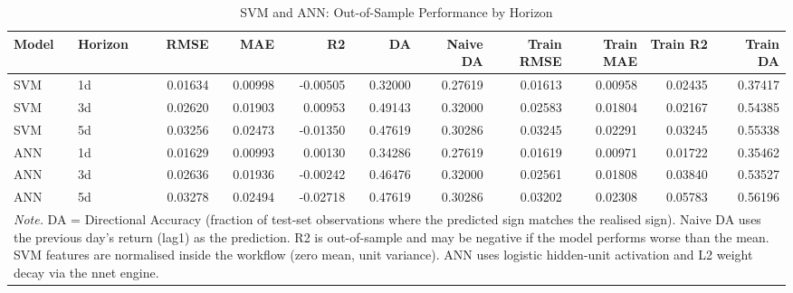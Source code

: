 \begin{table}[!ht]
\centering
\caption{\label{tab:svm_ann_metrics}SVM and ANN: Out-of-Sample Performance by Horizon}
\footnotesize
\setlength{\tabcolsep}{3.5pt}

\begin{tabular}{llrrrrrrrrr}
\toprule
Model & Horizon & RMSE & MAE & R2 & DA & Naive DA & Train RMSE & Train MAE & Train R2 & Train DA\\
\midrule
SVM & 1d & 0.01634 & 0.00998 & -0.00505 & 0.32000 & 0.27619 & 0.01613 & 0.00958 & 0.02435 & 0.37417\\
SVM & 3d & 0.02620 & 0.01903 & 0.00953 & 0.49143 & 0.32000 & 0.02583 & 0.01804 & 0.02167 & 0.54385\\
SVM & 5d & 0.03256 & 0.02473 & -0.01350 & 0.47619 & 0.30286 & 0.03245 & 0.02291 & 0.03245 & 0.55338\\
ANN & 1d & 0.01629 & 0.00993 & 0.00130 & 0.34286 & 0.27619 & 0.01619 & 0.00971 & 0.01722 & 0.35462\\
ANN & 3d & 0.02636 & 0.01936 & -0.00242 & 0.46476 & 0.32000 & 0.02561 & 0.01808 & 0.03840 & 0.53527\\
ANN & 5d & 0.03278 & 0.02494 & -0.02718 & 0.47619 & 0.30286 & 0.03202 & 0.02308 & 0.05783 & 0.56196\\
\bottomrule
\multicolumn{11}{p{\linewidth}}{\rule{0pt}{1em}\textit{Note.} DA = Directional Accuracy (fraction of test-set observations where the predicted sign matches the realised sign). Naive DA uses the previous day's return (lag1) as the prediction. R2 is out-of-sample and may be negative if the model performs worse than the mean. SVM features are normalised inside the workflow (zero mean, unit variance). ANN uses logistic hidden-unit activation and L2 weight decay via the nnet engine.}\\
\end{tabular}
\end{table}

